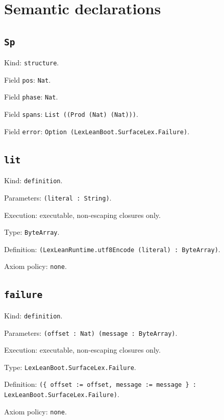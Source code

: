 \documentclass[11pt]{article}
\begin{document}
\section*{Semantic declarations}
\subsection*{\texttt{Sp}}
\noindent Kind: \texttt{structure}.\par
\noindent Field \texttt{pos}: \texttt{Nat}.\par
\noindent Field \texttt{phase}: \texttt{Nat}.\par
\noindent Field \texttt{spans}: \texttt{List ((Prod (Nat) (Nat)))}.\par
\noindent Field \texttt{error}: \texttt{Option (LexLeanBoot.SurfaceLex.Failure)}.\par
\subsection*{\texttt{lit}}
\noindent Kind: \texttt{definition}.\par
\noindent Parameters: \texttt{(literal : String)}.\par
\noindent Execution: executable, non-escaping closures only.\par
\noindent Type: \texttt{ByteArray}.\par
\noindent Definition: \texttt{(LexLeanRuntime.utf8Encode (literal) : ByteArray)}.\par
\noindent Axiom policy: \texttt{none}.\par
\subsection*{\texttt{failure}}
\noindent Kind: \texttt{definition}.\par
\noindent Parameters: \texttt{(offset : Nat) (message : ByteArray)}.\par
\noindent Execution: executable, non-escaping closures only.\par
\noindent Type: \texttt{LexLeanBoot.SurfaceLex.Failure}.\par
\noindent Definition: \texttt{(\{ offset := offset, message := message \} : LexLeanBoot.SurfaceLex.Failure)}.\par
\noindent Axiom policy: \texttt{none}.\par
\end{document}
